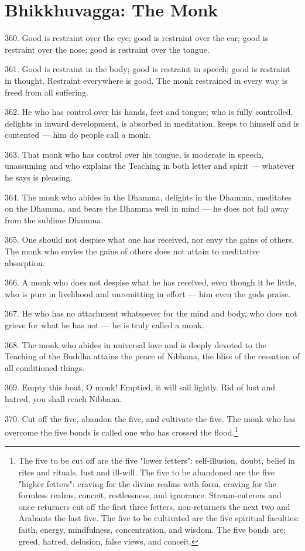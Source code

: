 \newpage
\chapter{Bhikkhuvagga: The Monk}
360. Good is restraint over the eye; good is restraint over the ear; good is restraint over the nose; good is restraint over the tongue.

361. Good is restraint in the body; good is restraint in speech; good is restraint in thought. Restraint everywhere is good. The monk restrained in every way is freed from all suffering.

362. He who has control over his hands, feet and tongue; who is fully controlled, delights in inward development, is absorbed in meditation, keeps to himself and is contented — him do people call a monk.

363. That monk who has control over his tongue, is moderate in speech, unassuming and who explains the Teaching in both letter and spirit — whatever he says is pleasing.

364. The monk who abides in the Dhamma, delights in the Dhamma, meditates on the Dhamma, and bears the Dhamma well in mind — he does not fall away from the sublime Dhamma.

365. One should not despise what one has received, nor envy the gains of others. The monk who envies the gains of others does not attain to meditative absorption.

366. A monk who does not despise what he has received, even though it be little, who is pure in livelihood and unremitting in effort — him even the gods praise.

367. He who has no attachment whatsoever for the mind and body, who does not grieve for what he has not — he is truly called a monk.

368. The monk who abides in universal love and is deeply devoted to the Teaching of the Buddha attains the peace of Nibbana, the bliss of the cessation of all conditioned things.

369. Empty this boat, O monk! Emptied, it will sail lightly. Rid of lust and hatred, you shall reach Nibbana.

370. Cut off the five, abandon the five, and cultivate the five. The monk who has overcome the five bonds is called one who has crossed the flood.\footnote{The five to be cut off are the five "lower fetters": self-illusion, doubt, belief in rites and rituals, lust and ill-will. The five to be abandoned are the five "higher fetters": craving for the divine realms with form, craving for the formless realms, conceit, restlessness, and ignorance. Stream-enterers and once-returners cut off the first three fetters, non-returners the next two and Arahants the last five. The five to be cultivated are the five spiritual faculties: faith, energy, mindfulness, concentration, and wisdom. The five bonds are: greed, hatred, delusion, false views, and conceit.}


